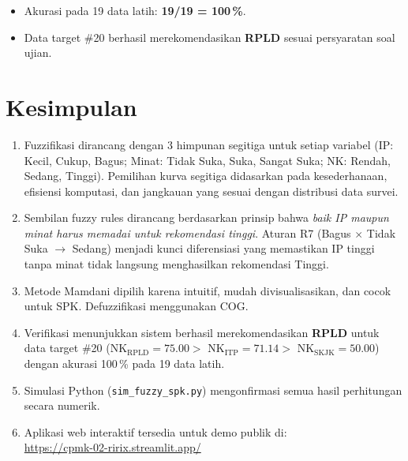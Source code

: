 \documentclass[conference]{IEEEtran}
\begin{document}
\begin{itemize}[nosep]
  \item Akurasi pada 19 data latih: \textbf{19/19 = 100\,\%}.
  \item Data target \#20 berhasil merekomendasikan \textbf{RPLD}
        sesuai persyaratan soal ujian.
\end{itemize}

\section{Kesimpulan}
\label{sec:kesimpulan}

\begin{enumerate}[nosep]
  \item Fuzzifikasi dirancang dengan 3 himpunan segitiga untuk setiap
        variabel (IP: Kecil, Cukup, Bagus; Minat: Tidak Suka, Suka,
        Sangat Suka; NK: Rendah, Sedang, Tinggi). Pemilihan kurva
        segitiga didasarkan pada kesederhanaan, efisiensi komputasi,
        dan jangkauan yang sesuai dengan distribusi data survei.
  \item Sembilan fuzzy rules dirancang berdasarkan prinsip bahwa
        \emph{baik IP maupun minat harus memadai untuk rekomendasi
        tinggi}. Aturan R7 (Bagus $\times$ Tidak Suka $\to$ Sedang)
        menjadi kunci diferensiasi yang memastikan IP tinggi tanpa
        minat tidak langsung menghasilkan rekomendasi Tinggi.
  \item Metode Mamdani dipilih karena intuitif, mudah divisualisasikan,
        dan cocok untuk SPK. Defuzzifikasi menggunakan COG.
  \item Verifikasi menunjukkan sistem berhasil merekomendasikan
        \textbf{RPLD} untuk data target \#20
        (NK$_{\text{RPLD}}=75.00 > $ NK$_{\text{ITP}}=71.14 > $
        NK$_{\text{SKJK}}=50.00$) dengan akurasi 100\,\% pada
        19 data latih.
  \item Simulasi Python (\texttt{sim\_fuzzy\_spk.py}) mengonfirmasi
        semua hasil perhitungan secara numerik.
  \item Aplikasi web interaktif tersedia untuk demo publik di:\\
        \url{https://cpmk-02-ririx.streamlit.app/}
\end{enumerate}
\end{document}
